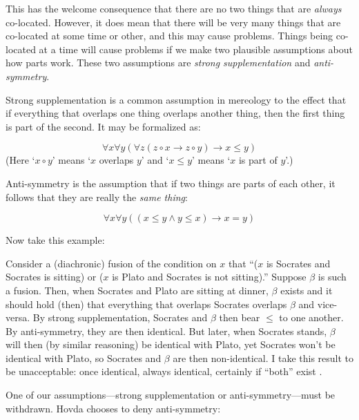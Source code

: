 \documentclass[11pt]{article}
\newenvironment{squote}{%
\begin{spacing}{1}
\begin{list}{}{%
\setlength{\labelwidth}{0pt}%
\rightmargin\leftmargin%
}
\item\relax
}{%
\end{list}%
\end{spacing}
}
\begin{document}
\begin{spacing}{1.5}
This has the welcome consequence that there are no two things that are
{\em always} co-located.  However, it does mean that there will be
very many things that are co-located at some time or other, and this
may cause problems.  Things being co-located at a time will cause
problems if we make two plausible assumptions about how parts work.
These two assumptions are {\em strong supplementation} and {\em
  anti-symmetry}.

Strong supplementation is a common assumption in mereology to the
effect that if everything that overlaps one thing overlaps another
thing, then the first thing is part of the second.  It may be
formalized as:

\begin{displaymath}
\forall x \forall y ( \forall z ( z \circ x \rightarrow z \circ y )
\rightarrow x \leq y )
\end{displaymath}
(Here `$x \circ y$' means `$x$ overlaps $y$' and `$x \leq y$' means
`$x$ is part of $y$'.)

Anti-symmetry is the assumption that if two things are parts of each
other, it follows that they are really the {\em same thing}:

\begin{displaymath}
\forall x \forall y ( ( x \leq y \wedge y \leq x ) \rightarrow x = y )
\end{displaymath}

Now take this example:

\begin{squote}
Consider a (diachronic) fusion of the condition on $x$ that ``($x$ is
Socrates and Socrates is sitting) or ($x$ is Plato and Socrates is not
sitting).''  Suppose $\beta$ is such a fusion.  Then, when Socrates
and Plato are sitting at dinner, $\beta$ exists and it should hold
(then) that everything that overlaps Socrates overlaps $\beta$ and
vice-versa.  By strong supplementation, Socrates and $\beta$ then bear
$\leq$ to one another.  By anti-symmetry, they are then identical.
But later, when Socrates stands, $\beta$ will then (by similar
reasoning) be identical with Plato, yet Socrates won't be identical
with Plato, so Socrates and $\beta$ are then non-identical.  I take
this result to be unacceptable: once identical, always identical,
certainly if ``both'' exist \citeyearpar[sec. 3.1.2]{hovda2011}.
\end{squote}

One of our assumptions---strong supplementation or
anti-symmetry---must be withdrawn.  Hovda chooses to deny
anti-symmetry:


\end{spacing}
\end{document}

